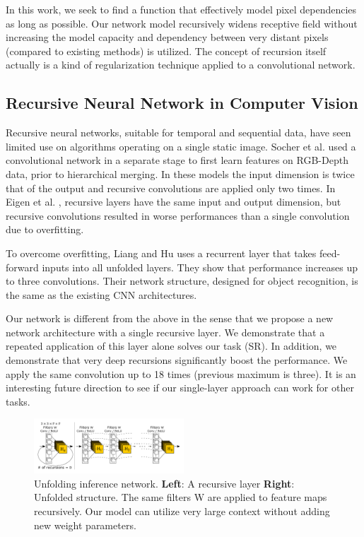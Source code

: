 \documentclass[10pt,twocolumn,letterpaper]{article}
\begin{document}
In this work, we seek to find a function that effectively model pixel dependencies as long as possible. Our network model recursively widens receptive field without increasing the model capacity and dependency between very distant pixels (compared to existing methods) is utilized. The concept of recursion itself actually is a kind of regularization technique applied to a convolutional network. 

\subsection{Recursive Neural Network in Computer Vision}

Recursive neural networks, suitable for temporal and sequential data, have seen limited use on algorithms operating on a single static image.   Socher et al.  \cite{socher2012convolutional} used a convolutional network in a separate stage to first learn features on RGB-Depth data, prior to hierarchical merging. In these models the input dimension is twice that of the output and recursive convolutions are applied only two times. In Eigen et al. \cite{Eigen2014}, recursive layers have the same input and output dimension, but recursive convolutions resulted in worse performances than a single convolution due to overfitting. 

To overcome overfitting, Liang and Hu \cite{Liang_2015_CVPR} uses a recurrent layer that takes feed-forward inputs into all unfolded layers. They show that performance increases up to three convolutions. Their network structure, designed for object recognition, is the same as the existing CNN architectures.

Our network is different from the above in the sense that we propose a new network architecture with a single recursive layer. We demonstrate that a repeated application of this layer alone solves our task (SR). In addition, we demonstrate that very deep recursions significantly boost the performance. We apply the same convolution up to 18 times (previous maximum is three). It is an interesting future direction to see if our single-layer approach can work for other tasks.  

\begin{figure}[t]
	\includegraphics[width=0.5\textwidth]{figs/f2}
	\caption {Unfolding inference network. \textbf{Left}: A recursive layer \textbf{Right}: Unfolded structure. The same filters W are applied to feature maps recursively. Our model can utilize very large context without adding new weight parameters. }
	\label{fig:inference_network}
\end{figure}
\end{document}

